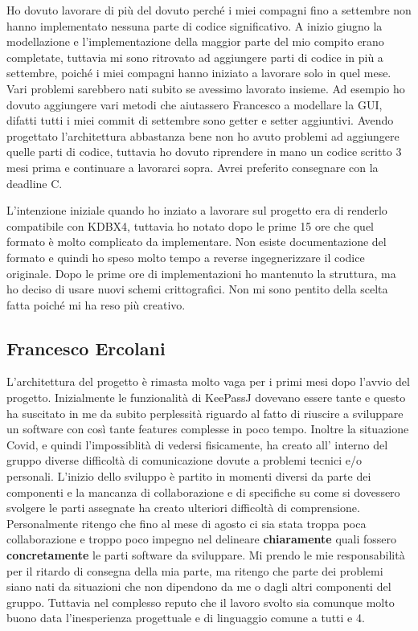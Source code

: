 \documentclass[a4paper,12pt]{report}
\begin{document}
Ho dovuto lavorare di più del dovuto perché i miei compagni fino a settembre
non hanno implementato nessuna parte di codice significativo.
A inizio giugno la modellazione e l'implementazione della maggior parte del mio
compito erano completate, tuttavia mi sono ritrovato ad aggiungere parti di 
codice in più a settembre, poiché i miei compagni hanno iniziato a lavorare
solo in quel mese. Vari problemi sarebbero nati subito se avessimo lavorato
insieme. Ad esempio ho dovuto aggiungere vari metodi che aiutassero Francesco a modellare
la GUI, difatti tutti i miei commit di settembre sono getter e setter aggiuntivi.
Avendo progettato l'architettura abbastanza bene non ho avuto problemi ad aggiungere
quelle parti di codice, tuttavia ho dovuto riprendere in mano un codice scritto 3 mesi
prima e continuare a lavorarci sopra. Avrei preferito consegnare con la deadline C.

L'intenzione iniziale quando ho inziato a lavorare sul progetto era di renderlo
compatibile con KDBX4, tuttavia ho notato dopo le prime 15 ore che quel formato
è molto complicato da implementare. Non esiste documentazione del formato e quindi
ho speso molto tempo a reverse ingegnerizzare il codice originale. Dopo le prime ore
di implementazioni ho mantenuto la struttura, ma ho deciso di usare nuovi schemi
crittografici. Non mi sono pentito della scelta fatta poiché mi ha reso più creativo.

\subsection*{Francesco Ercolani}
L'architettura del progetto è rimasta molto vaga per i primi mesi dopo l'avvio del progetto. 
Inizialmente le funzionalità di KeePassJ dovevano essere tante e questo ha suscitato in me 
da subito perplessità riguardo al fatto di riuscire a sviluppare un software con così tante 
features complesse in poco tempo.
Inoltre la situazione Covid, e quindi l'impossiblità di vedersi fisicamente, ha creato all'
interno del gruppo diverse difficoltà di comunicazione dovute a problemi tecnici e/o personali.
L'inizio dello sviluppo è partito in momenti diversi da parte dei componenti e la mancanza di 
collaborazione e di specifiche su come si dovessero svolgere le parti assegnate ha creato ulteriori difficoltà di comprensione.
Personalmente ritengo che fino al mese di agosto ci sia stata troppa poca collaborazione e 
troppo poco impegno nel delineare \textbf{chiaramente} quali fossero \textbf{concretamente} 
le parti software da sviluppare.
Mi prendo le mie responsabilità per il ritardo di consegna della mia parte, ma ritengo che 
parte dei problemi siano nati da situazioni che non dipendono da me o dagli altri componenti del gruppo.
Tuttavia nel complesso reputo che il lavoro svolto sia comunque molto buono data 
l'inesperienza progettuale e di linguaggio comune a tutti e 4.
\end{document}
